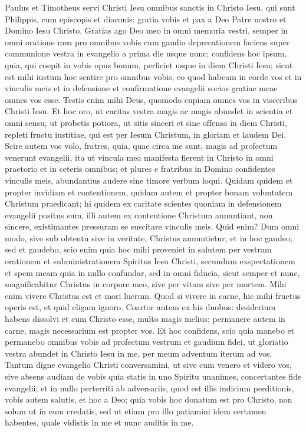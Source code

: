 \begin{biblechapter}
 \verse Paulus et Timotheus servi Christi Iesu omnibus sanctis in Christo Iesu, qui sunt Philippis, cum episcopis et diaconis: 
\verse gratia vobis et pax a Deo Patre nostro et Domino Iesu Christo. 
\verse Gratias ago Deo meo in omni memoria vestri, 
\verse semper in omni oratione mea pro omnibus vobis cum gaudio deprecationem faciens 
\verse super communione vestra in evangelio a prima die usque nunc; 
\verse confidens hoc ipsum, quia, qui coepit in vobis opus bonum, perficiet usque in diem Christi Iesu; 
\verse sicut est mihi iustum hoc sentire pro omnibus vobis, eo quod habeam in corde vos et in vinculis meis et in defensione et confirmatione evangelii socios gratiae meae omnes vos esse. 
\verse Testis enim mihi Deus, quomodo cupiam omnes vos in visceribus Christi Iesu. 
 \verse Et hoc oro, ut caritas vestra magis ac magis abundet in scientia et omni sensu, 
\verse ut probetis potiora, ut sitis sinceri et sine offensa in diem Christi, 
\verse repleti fructu iustitiae, qui est per Iesum Christum, in gloriam et laudem Dei.
 \verse Scire autem vos volo, fratres, quia, quae circa me sunt, magis ad profectum venerunt evangelii, 
\verse ita ut vincula mea manifesta fierent in Christo in omni praetorio et in ceteris omnibus; 
\verse et plures e fratribus in Domino confidentes vinculis meis, abundantius audere sine timore verbum loqui. 
\verse Quidam quidem et propter invidiam et contentionem, quidam autem et propter bonam voluntatem Christum praedicant; 
\verse hi quidem ex caritate scientes quoniam in defensionem evangelii positus sum, 
\verse illi autem ex contentione Christum annuntiant, non sincere, existimantes pressuram se suscitare vinculis meis. 
 \verse Quid enim? Dum omni modo, sive sub obtentu sive in veritate, Christus annuntietur, et in hoc gaudeo; sed et gaudebo, 
\verse scio enim quia hoc mihi proveniet in salutem per vestram orationem et subministrationem Spiritus Iesu Christi, 
\verse secundum exspectationem et spem meam quia in nullo confundar, sed in omni fiducia, sicut semper et nunc, magnificabitur Christus in corpore meo, sive per vitam sive per mortem.
 \verse Mihi enim vivere Christus est et mori lucrum. 
\verse Quod si vivere in carne, hic mihi fructus operis est, et quid eligam ignoro. 
\verse Coartor autem ex his duobus: desiderium habens dissolvi et cum Christo esse, multo magis melius; 
 \verse permanere autem in carne, magis necessarium est propter vos. 
\verse Et hoc confidens, scio quia manebo et permanebo omnibus vobis ad profectum vestrum et gaudium fidei, 
\verse ut gloriatio vestra abundet in Christo Iesu in me, per meum adventum iterum ad vos.
 \verse Tantum digne evangelio Christi conversamini, ut sive cum venero et videro vos, sive absens audiam de vobis quia statis in uno Spiritu unanimes, concertantes fide evangelii; 
\verse et in nullo perterriti ab adversariis, quod est illis indicium perditionis, vobis autem salutis, et hoc a Deo; 
\verse quia vobis hoc donatum est pro Christo, non solum ut in eum credatis, sed ut etiam pro illo patiamini 
\verse idem certamen habentes, quale vidistis in me et nunc auditis in me.
 

\end{biblechapter}
